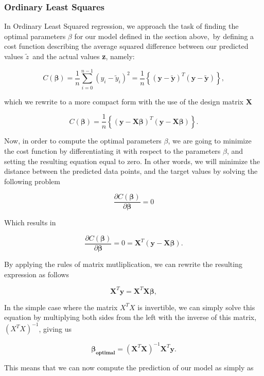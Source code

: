 \documentclass[a4paper, 10pt]{article}
\begin{document}
\subsubsection{Ordinary Least Squares}
In Ordinary Least Squared regression, we approach the task of finding the optimal parameters $\beta$ for our model defined in the section above, by defining a cost function describing the average squared difference between our predicted values \textbf{$\tilde{z}$} and the actual values \textbf{z}, namely: 

$$
C(\boldsymbol{\beta})=\frac{1}{n}\sum_{i=0}^{n-1}\left(y_i-\tilde{y}_i\right)^2=\frac{1}{n}\left\{\left(\boldsymbol{y}-\boldsymbol{\tilde{y}}\right)^T\left(\boldsymbol{y}-\boldsymbol{\tilde{y}}\right)\right\},
$$

which we rewrite to a more compact form with the use of the design matrix \textbf{X}

$$
C(\boldsymbol{\beta})=\frac{1}{n}\left\{\left(\boldsymbol{y}-\boldsymbol{X}\boldsymbol{\beta}\right)^T\left(\boldsymbol{y}-\boldsymbol{X}\boldsymbol{\beta}\right)\right\}.
$$

Now, in order to compute the optimal parameters $\beta$, we are going to minimize the cost function by differentiating it with respect to the parameters $\beta$, and setting the resulting equation equal to zero. In other words, we will minimize the distance between the predicted data points, and the target values by solving the following problem

$$
\frac{\partial C(\boldsymbol{\beta})}{\partial \boldsymbol{\beta}} = 0
$$

Which results in

$$
\frac{\partial C(\boldsymbol{\beta})}{\partial \boldsymbol{\beta}} = 0 = \boldsymbol{X}^T\left( \boldsymbol{y}-\boldsymbol{X}\boldsymbol{\beta}\right).
$$

By applying the rules of matrix mutliplication, we can rewrite the resulting expression as follows

$$
\boldsymbol{X}^T\boldsymbol{y} = \boldsymbol{X}^T\boldsymbol{X}\boldsymbol{\beta},
$$

In the simple case where the matrix $X^TX$ is invertible, we can simply solve this equation by multiplying both sides from the left with the inverse of this matrix, $(X^TX)^{-1}$, giving us

$$
\boldsymbol{\beta_{optimal}} =\left(\boldsymbol{X}^T\boldsymbol{X}\right)^{-1}\boldsymbol{X}^T\boldsymbol{y}.
$$

This means that we can now compute the prediction of our model as simply as
\end{document}
